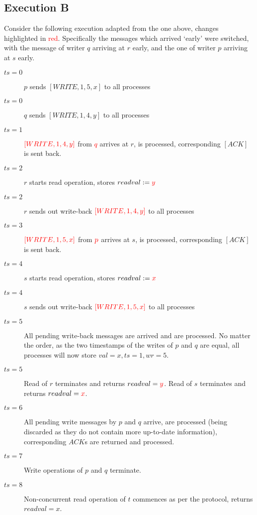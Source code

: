 \documentclass[a4paper]{scrreprt}
\begin{document}
\subsection{Execution B}

Consider the following execution adapted from the one above, changes
highlighted in \textcolor{red}{red}. Specifically the messages which arrived
`early' were switched, with the message of writer $q$ arriving at $r$ early,
and the one of writer $p$ arriving at $s$ early.

\begin{description}
	\item[$ts = 0$] $p$ sends $[WRITE, 1, 5, x]$ to all processes
	\item[$ts = 0$] $q$ sends $[WRITE, 1, 4, y]$ to all processes
	\item[$ts = 1$] $\textcolor{red}{[WRITE, 1, 4, y]}$ from
		\textcolor{red}{$q$} arrives at $r$, is processed,
		corresponding $[ACK]$ is sent back.
	\item[$ts = 2$] $r$ starts read operation, stores $readval :=
		\textcolor{red}{y}$
	\item[$ts = 2$] $r$ sends out write-back $\textcolor{red}{[WRITE, 1, 4,
		y]}$ to all processes
	\item[$ts = 3$] $\textcolor{red}{[WRITE, 1, 5, x]}$ from
		$\textcolor{red}{p}$ arrives at $s$, is processed,
		corresponding $[ACK]$ is sent back.
	\item[$ts = 4$] $s$ starts read operation, stores $readval :=
		\textcolor{red}{x}$
	\item[$ts = 4$] $s$ sends out write-back $\textcolor{red}{[WRITE, 1, 5,
		x]}$ to all processes
	\item[$ts = 5$] All pending write-back messages are arrived and are
		processed. No matter the order, as the two timestamps of the
		writes of $p$ and $q$ are equal, all processes will now store
		$val = x, ts = 1, wr = 5$.
	\item[$ts = 5$] Read of $r$ terminates and returns $readval =
		\textcolor{red}{y}$. Read of $s$ terminates and returns
		$readval = \textcolor{red}{x}$.
	\item[$ts = 6$] All pending write messages by $p$ and $q$ arrive, are
		processed (being discarded as they do not contain more
		up-to-date information), corresponding $ACK$s are returned and
		processed.
	\item[$ts = 7$] Write operations of $p$ and $q$ terminate.
	\item[$ts = 8$] Non-concurrent read operation of $t$ commences as per
		the protocol, returns $readval = x$.
\end{description}
\end{document}
